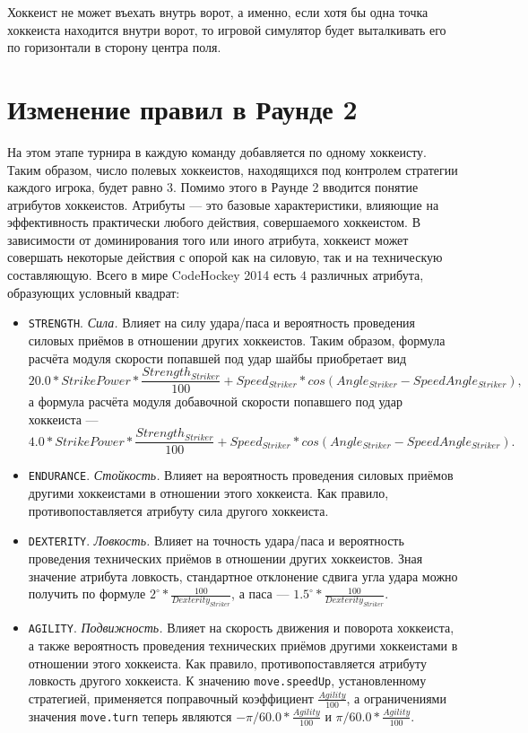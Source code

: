 Хоккеист не может въехать внутрь ворот, а именно, если хотя бы одна точка хоккеиста находится внутри ворот, то игровой симулятор будет
выталкивать его по горизонтали в сторону центра поля.

\section{Изменение правил в Раунде 2}

На этом этапе турнира в каждую команду добавляется по одному хоккеисту. Таким образом, число полевых хоккеистов, находящихся под контролем
стратегии каждого игрока, будет равно $3$. Помимо этого в Раунде 2 вводится понятие атрибутов хоккеистов. Атрибуты --- это базовые
характеристики, влияющие на эффективность практически любого действия, совершаемого хоккеистом. В зависимости от доминирования того или
иного атрибута, хоккеист может совершать некоторые действия с опорой как на силовую, так и на техническую составляющую. Всего в мире
CodeHockey 2014 есть $4$ различных атрибута, образующих условный квадрат:
\begin{itemize}
  \item \texttt{STRENGTH}. \textit{Сила.} Влияет на силу удара/паса и вероятность проведения силовых приёмов в отношении других хоккеистов.
        Таким образом, формула расчёта модуля скорости попавшей под удар шайбы приобретает вид
        \begin{equation}
        20.0*StrikePower*\frac{Strength_{Striker}}{100}+Speed_{Striker}*cos(Angle_{Striker}-SpeedAngle_{Striker}),
        \end{equation}
        а формула расчёта модуля добавочной скорости попавшего под удар хоккеиста ---
        \begin{equation}
        4.0*StrikePower*\frac{Strength_{Striker}}{100}+Speed_{Striker}*cos(Angle_{Striker}-SpeedAngle_{Striker}).
        \end{equation}
  \item \texttt{ENDURANCE}. \textit{Стойкость.} Влияет на вероятность проведения силовых приёмов другими хоккеистами в отношении этого
        хоккеиста. Как правило, противопоставляется атрибуту сила другого хоккеиста.
  \item \texttt{DEXTERITY}. \textit{Ловкость.} Влияет на точность удара/паса и вероятность проведения технических приёмов в отношении других
        хоккеистов. Зная значение атрибута ловкость, стандартное отклонение сдвига угла удара можно получить по формуле
        $2^\circ*\frac{100}{Dexterity_{Striker}}$, а паса --- $1.5^\circ*\frac{100}{Dexterity_{Striker}}$.
  \item \texttt{AGILITY}. \textit{Подвижность.} Влияет на скорость движения и поворота хоккеиста, а также вероятность проведения технических
        приёмов другими хоккеистами в отношении этого хоккеиста. Как правило, противопоставляется атрибуту ловкость другого хоккеиста.
        К значению \texttt{move.speedUp}, установленному стратегией, применяется поправочный коэффициент $\frac{Agility}{100}$, а
        ограничениями значения \texttt{move.turn} теперь являются $-\pi/60.0*\frac{Agility}{100}$ и $\pi/60.0*\frac{Agility}{100}$.
\end{itemize}

